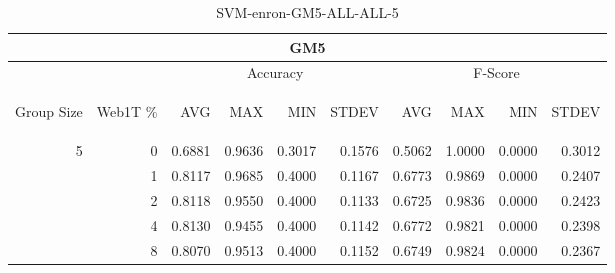 \begin{center}
\begin{table}[htbp] 
 \begin{center}
\begin{tabular}{ | r | r | r | r | r | r | r | r | r | r |}
\hline
\multicolumn{10}{|c|}{GM5}\\
\hline
 & & \multicolumn{4}{|c|}{Accuracy} & \multicolumn{4}{|c|}{F-Score}\\ \cline{3-10}
\begin{sideways}Group Size\end{sideways} & \begin{sideways}Web1T \%\end{sideways} & \begin{sideways}AVG\end{sideways} & \begin{sideways}MAX\end{sideways} & \begin{sideways}MIN\end{sideways} & \begin{sideways}STDEV\end{sideways} & \begin{sideways}AVG\end{sideways} & \begin{sideways}MAX\end{sideways} & \begin{sideways}MIN\end{sideways} & \begin{sideways}STDEV\end{sideways}\\
\hline
\multirow{4}{*}{5}
 & 0 & 0.6881 & 0.9636 & 0.3017 & 0.1576 & 0.5062 & 1.0000 & 0.0000 & 0.3012\\ \cline{2-10}
 & 1 & 0.8117 & 0.9685 & 0.4000 & 0.1167 & 0.6773 & 0.9869 & 0.0000 & 0.2407\\ \cline{2-10}
 & 2 & 0.8118 & 0.9550 & 0.4000 & 0.1133 & 0.6725 & 0.9836 & 0.0000 & 0.2423\\ \cline{2-10}
 & 4 & 0.8130 & 0.9455 & 0.4000 & 0.1142 & 0.6772 & 0.9821 & 0.0000 & 0.2398\\ \cline{2-10}
 & 8 & 0.8070 & 0.9513 & 0.4000 & 0.1152 & 0.6749 & 0.9824 & 0.0000 & 0.2367\\ \cline{2-10}
\hline
\end{tabular}
\caption{SVM-enron-GM5-ALL-ALL-5}
\label{table:SVM-enron-GM5-ALL-ALL-5}
\end{center}
 \end{table}
\end{center}

